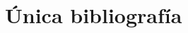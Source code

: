 \documentclass[12pt]{article}
\begin{document}

\newpage
\section{Única bibliografía}
\nocite{*}
\begingroup
\renewcommand{\section}[2]{}%
\printbibliography
\endgroup
\end{document}
